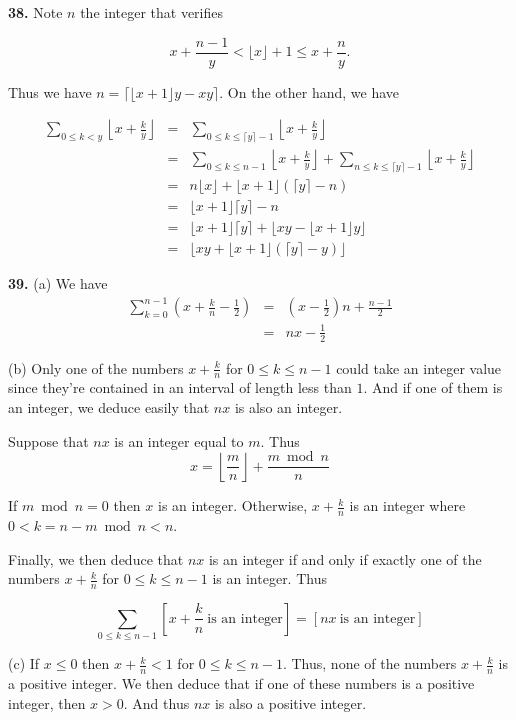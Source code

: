 \documentclass[a4paper,12pt]{article}
\newcommand{\newpar}[1]{\bigskip \noindent \textbf{#1.}}
\newcommand{\subpar}[1]{\medskip \noindent (#1)}
\begin{document}
\newpar{38}  Note $n$ the integer that verifies

\[ x + \frac{n-1}{y} < \lfloor x\rfloor + 1 \le x + \frac{n}{y} .\]

Thus we have $n = \lceil \lfloor x + 1\rfloor y - x y\rceil$.   On the
other hand, we have

\begin{eqnarray*}
  \sum_{0\le k <y}\left\lfloor x + \frac{k}{y}\right\rfloor &=&
  \sum_{0\le k\le\lceil y\rceil -1}\left\lfloor x +
  \frac{k}{y}\right\rfloor \\ &=&
  \sum_{0\le k\le n-1}\left\lfloor x + \frac{k}{y}\right\rfloor +
  \sum_{n\le k\le \lceil y\rceil - 1}\left\lfloor x +
  \frac{k}{y}\right\rfloor \\ &=&
  n\lfloor x\rfloor + \lfloor x+1\rfloor(\lceil y\rceil - n) \\ &=&
  \lfloor x+1\rfloor \lceil y\rceil - n \\ &=&
  \lfloor x+1\rfloor \lceil y\rceil + \lfloor xy - \lfloor x+1\rfloor
  y\rfloor \\ &=&
  \lfloor xy + \lfloor x+1\rfloor(\lceil y\rceil - y)\rfloor
\end{eqnarray*}

\newpar{39} \subpar{a} We have
\begin{eqnarray*}
  \sum_{k=0}^{n-1} \left(x + \frac{k}{n} - \frac{1}{2} \right) &=&
  \left(x - \frac{1}{2}\right) n + \frac{n-1}{2} \\
  &=& nx - \frac{1}{2}
\end{eqnarray*}

\subpar{b} Only one of the numbers $x + \frac{k}{n}$ for $0\le k\le
n-1$ could take an integer value since they're contained in an
interval of length less than $1$.  And if one of them is an integer,
we deduce easily that $nx$ is also an integer.

Suppose that $n x$ is an integer equal to $m$.  Thus
\[ x = \left\lfloor \frac{m}{n}\right\rfloor + \frac{m \bmod n}{n}\]

If $m \bmod n = 0$ then $x$ is an integer.  Otherwise, $x +
\frac{k}{n}$ is an integer where $0 < k = n - m \bmod n < n$.

Finally, we then deduce that $nx$ is an integer if and only if exactly
one of the numbers $x + \frac{k}{n}$ for $0\le k\le n-1$ is an
integer.  Thus

\[ \sum_{0\le k\le n-1} \left[x+\frac{k}{n}\ \mbox{is an
    integer}\right] = [ nx\ \mbox{is an integer}]\]

\subpar{c} If $x \le 0$ then $x + \frac{k}{n} < 1$ for $0\le k\le
n-1$.  Thus, none of the numbers $x + \frac{k}{n}$ is a positive
integer.  We then deduce that if one of these numbers is a positive
integer, then $x > 0$.  And thus $nx$ is also a positive integer.
\end{document}
